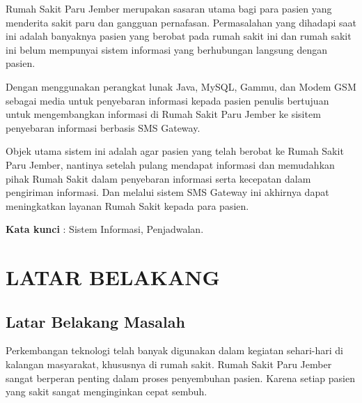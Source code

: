 \documentclass{jtetiproposalskripsi}
\begin{document}
\cover

\approvalpage


\begin{abstractind}
Rumah Sakit Paru Jember merupakan sasaran utama bagi para pasien yang menderita sakit paru dan gangguan pernafasan. Permasalahan yang dihadapi saat ini adalah banyaknya pasien yang berobat pada rumah sakit ini dan rumah sakit ini belum mempunyai sistem informasi yang berhubungan langsung dengan pasien.

Dengan menggunakan perangkat lunak Java,  MySQL, Gammu, dan Modem GSM sebagai media untuk penyebaran informasi kepada pasien penulis bertujuan untuk mengembangkan informasi di Rumah Sakit Paru Jember ke sisitem penyebaran informasi berbasis SMS Gateway.

Objek utama sistem ini adalah agar pasien yang telah berobat ke Rumah Sakit Paru Jember, nantinya setelah pulang mendapat informasi dan memudahkan pihak Rumah Sakit dalam penyebaran informasi serta kecepatan dalam pengiriman informasi. Dan melalui sistem SMS Gateway ini akhirnya dapat meningkatkan layanan Rumah Sakit kepada para pasien.


\bigskip
\textbf{Kata kunci} : Sistem Informasi, Penjadwalan.
\end{abstractind}

\tableofcontents
{}
\clearpage{}\setcounter{page}{1}

\chapter{LATAR BELAKANG}

\section{Latar Belakang Masalah}
Perkembangan teknologi telah banyak digunakan dalam kegiatan sehari-hari di kalangan masyarakat, khususnya di rumah sakit. Rumah Sakit Paru Jember sangat berperan penting dalam proses penyembuhan pasien. Karena setiap pasien yang sakit sangat menginginkan cepat sembuh.
\end{document}
